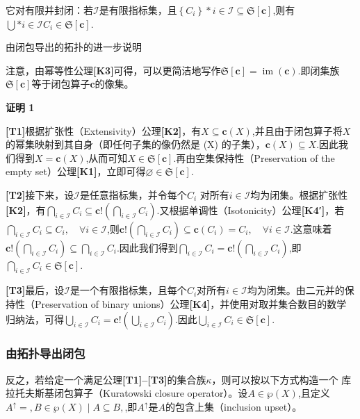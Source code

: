 它对有限并封闭：若$\mathcal{I}$是有限指标集，且$\left\{ C_i \right\}*{i \in \mathcal{I}} \subseteq {\mathfrak{S}}[\mathbf{c}]$,则有$\bigcup*{i \in \mathcal{I}} C_i \in {\mathfrak{S}}[\mathbf{c}]$.

由闭包导出的拓扑的进一步说明

注意，由幂等性公理\textbf{[K3]}可得，可以更简洁地写作${\mathfrak{S}}[\mathbf{c}] = \operatorname{im}(\mathbf{c})$.即闭集族${\mathfrak{S}}[\mathbf{c}]$等于闭包算子$\mathbf{c}$的像集。

\textbf{证明 1}

\textbf{[T1]}根据扩张性（Extensivity）公理\textbf{[K2]}，有$X \subseteq \mathbf{c}(X)$,并且由于闭包算子将$X$的幂集映射到其自身（即任何子集的像仍然是 (X) 的子集），$\mathbf{c}(X) \subseteq X$.因此我们得到$X = \mathbf{c}(X)$,从而可知$X \in {\mathfrak{S}}[\mathbf{c}]$.再由空集保持性（Preservation of the empty set）公理\textbf{[K1]}，立即可得$\varnothing \in {\mathfrak{S}}[\mathbf{c}]$.

\textbf{[T2]}接下来，设$\mathcal{I}$是任意指标集，并令每个$C_i$ 对所有$i \in \mathcal{I}$均为闭集。根据扩张性\textbf{[K2]}，有$\bigcap_{i \in \mathcal{I}} C_i \subseteq \mathbf{c}!\left( \bigcap_{i \in \mathcal{I}} C_i \right)$.又根据单调性（Isotonicity）公理\textbf{[K4′]}，若$\bigcap_{i \in \mathcal{I}} C_i \subseteq C_i, \quad \forall i \in \mathcal{I}$,则$\mathbf{c}!\left( \bigcap_{i \in \mathcal{I}} C_i \right) \subseteq \mathbf{c}(C_i) = C_i, \quad \forall i \in \mathcal{I}$.这意味着$\mathbf{c}!\left( \bigcap_{i \in \mathcal{I}} C_i \right) \subseteq \bigcap_{i \in \mathcal{I}} C_i$.因此我们得到$\bigcap_{i \in \mathcal{I}} C_i = \mathbf{c}!\left( \bigcap_{i \in \mathcal{I}} C_i \right)$,即$\bigcap_{i \in \mathcal{I}} C_i \in {\mathfrak{S}}[\mathbf{c}]$.

\textbf{[T3]}最后，设$\mathcal{I}$是一个有限指标集，且每个$C_i$对所有$i \in \mathcal{I}$均为闭集。由二元并的保持性（Preservation of binary unions）公理\textbf{[K4]}，并使用对取并集合数目的数学归纳法，可得$\bigcup_{i \in \mathcal{I}} C_i = \mathbf{c}!\left( \bigcup_{i \in \mathcal{I}} C_i \right)$.因此$\bigcup_{i \in \mathcal{I}} C_i \in {\mathfrak{S}}[\mathbf{c}]$.
\subsubsection{由拓扑导出闭包}
反之，若给定一个满足公理\textbf{[T1]–[T3]}的集合族$\kappa$，则可以按以下方式构造一个 库拉托夫斯基闭包算子（Kuratowski closure operator）。设$A \in \wp(X)$,且定义$A^{\uparrow} = {, B \in \wp(X) \mid A \subseteq B ,}$,即$A^{\uparrow}$是$A$的包含上集（inclusion upset）。

